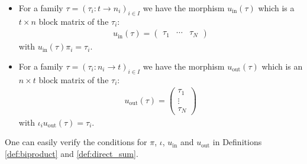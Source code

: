 \begin{example}
\begin{itemize}
\item For a family $\tau = (\tau_{i} : t \rightarrow n_{i})_{i\in I}$ we have the morphism $u_{\text{in}}(\tau)$ which is a $t \times n$ block matrix of
the $\tau_{i}$:
\begin{align}
u_{\text{in}}(\tau) = \label{eq:u_in_direct_sum_matrix}
\begin{pmatrix}
\tau_{1} & \cdots & \tau_{N}
\end{pmatrix}
\end{align}
with $u_{\text{in}}(\tau) \pi_{i} = \tau_{i}$.
\item For a family $\tau = (\tau_{i} : n_{i} \rightarrow t)_{i \in I}$ we have the morphism $u_{\text{out}}(\tau)$ which is an $n \times t$ block matrix
of the $\tau_{i}$:
\begin{align}
u_{\text{out}}(\tau) = \label{eq:u_out_direct_sum_matrix}
\begin{pmatrix}
\tau_{1} \\
\vdots \\
\tau_{N}
\end{pmatrix}
\end{align}
with $\iota_{i} u_{\text{out}}(\tau) = \tau_{i}$.
\end{itemize}
One can easily verify the conditions for $\pi$, $\iota$, $u_{\text{in}}$ and $u_{\text{out}}$ in Definitions \ref{def:biproduct} and \ref{def:direct_sum}.
\end{example}


